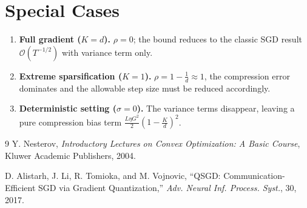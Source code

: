 \documentclass{article}
\begin{document}
\section*{Special Cases}
\begin{enumerate}[leftmargin=*]
\item \textbf{Full gradient ($K=d$).} $\rho=0$; the bound reduces to the classic SGD result $\mathcal{O}(T^{-1/2})$ with variance term only.
\item \textbf{Extreme sparsification ($K=1$).} $\rho=1-\frac{1}{d}\approx1$, the compression error dominates and the allowable step size must be reduced accordingly.
\item \textbf{Deterministic setting ($\sigma=0$).} The variance terms disappear, leaving a pure compression bias term $\frac{L\eta G^{2}}{2}(1-\frac{K}{d})^{2}$.
\end{enumerate}

\begin{thebibliography}{9}
Y. Nesterov, \emph{Introductory Lectures on Convex Optimization: A Basic Course}, Kluwer Academic Publishers, 2004.

D. Alistarh, J. Li, R. Tomioka, and M. Vojnovic, ``QSGD: Communication-Efficient SGD via Gradient Quantization,'' \emph{Adv. Neural Inf. Process. Syst.}, 30, 2017.
\end{thebibliography}
\end{document}
